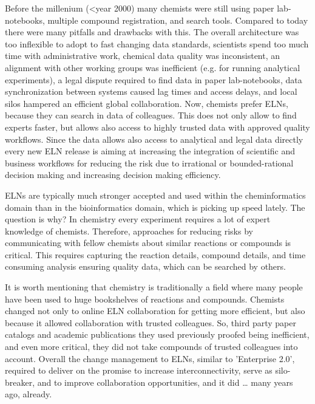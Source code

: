 \documentclass{sig-alternate}
\begin{document}
Before the millenium (<year 2000) many chemists were still using paper
lab-notebooks, multiple compound registration, and search tools. Compared to
today there were many pitfalls and drawbacks with this. The overall architecture
was too inflexible to adopt to fast changing data standards, scientists spend
too much time with administrative work, chemical data quality was inconsistent,
an alignment with other working groups was inefficient (e.g. for running
analytical experiments), a legal dispute required to find data in paper
lab-notebooks, data synchronization between systems caused lag times and access
delays, and local silos hampered an efficient global collaboration. Now,
chemists prefer ELNs, because they can search in data of colleagues. This does
not only allow to find experts faster, but allows also access to highly trusted
data with approved quality workflows. Since the data allows also access to
analytical and legal data directly every new ELN release is aiming at increasing
the integration of scientific and business workflows for reducing the risk due
to irrational or bounded-rational decision making and increasing decision making
efficiency.

ELNs are typically much stronger accepted and used within the cheminformatics
domain than in the bioinformatics domain, which is picking up speed lately. The
question is why? In chemistry every experiment requires a lot of expert
knowledge of chemists. Therefore, approaches for reducing risks by communicating
with fellow chemists about similar reactions or compounds is critical. This
requires capturing the reaction details, compound details, and time consuming
analysis ensuring quality data, which can be searched by others.

It is worth mentioning that chemistry is traditionally a field where many people
have been used to huge bookshelves of reactions and compounds. Chemists changed
not only to online ELN collaboration for getting more efficient, but also
because it allowed collaboration with trusted colleagues. So, third party paper
catalogs and academic publications they used previously proofed being
inefficient, and even more critical, they did not take compounds of trusted
colleagues into account. Overall the change management to ELNs, similar to
'Enterprise 2.0', required to deliver on the promise to increase
interconnectivity, serve as silo-breaker, and to improve collaboration
opportunities, and it did … many years ago, already.
\end{document}
